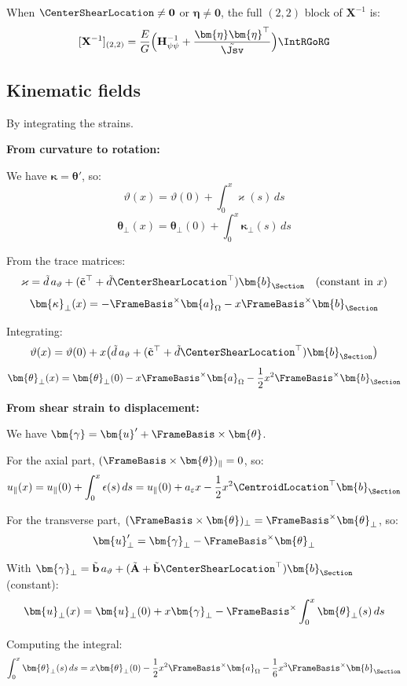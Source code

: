 When \(\CenterShearLocation \neq \mathbf{0}\) or \(\bm{\eta} \neq \mathbf{0}\),
the full \((2,2)\) block of \(\mathbf{X}^{-1}\) is:
\[[\mathbf{X}^{-1}]_{(2,2)} = \frac{E}{G}\Big(\mathbf{H}_{\psi\psi}^{-1} + \frac{\bm{\eta}\bm{\eta}^\top}{\tilde{\Jsv}}\Big)\IntRGoRG\]


\subsection{Kinematic fields}

By integrating the strains.

\textbf{From curvature to rotation:}

We have \(\bm{\kappa} = \bm{\theta}'\), so:
\[\vartheta(x) = \vartheta(0) + \int_0^x \varkappa(s)\,ds\]
\[\bm{\theta}_\perp(x) = \bm{\theta}_\perp(0) + \int_0^x \bm{\kappa}_\perp(s)\,ds\]

From the trace matrices:
\[\varkappa = \tilde{d}\,a_\vartheta + (\tilde{\mathbf{c}}^\top + \tilde{d}\CenterShearLocation^\top)\bm{b}_{\Section} \quad \text{(constant in } x\text{)}\]
\[\bm{\kappa}_\perp(x) = -\FrameBasis^\times\bm{a}_\Omega - x\FrameBasis^\times\bm{b}_{\Section}\]

Integrating:
\[\vartheta(x) = \vartheta(0) + x\big(\tilde{d}\,a_\vartheta + (\tilde{\mathbf{c}}^\top + \tilde{d}\CenterShearLocation^\top)\bm{b}_{\Section}\big)\]
\[\bm{\theta}_\perp(x) = \bm{\theta}_\perp(0) - x\FrameBasis^\times\bm{a}_\Omega - \frac{1}{2}x^2\FrameBasis^\times\bm{b}_{\Section}\]

\textbf{From shear strain to displacement:}

We have \(\bm{\gamma} = \bm{u}' + \FrameBasis \times \bm{\theta}\).

For the axial part, \((\FrameBasis \times \bm{\theta})_\parallel = 0\),
so:
\[u_\parallel(x) = u_\parallel(0) + \int_0^x \epsilon(s)\,ds = u_\parallel(0) + a_\varepsilon x - \frac{1}{2}x^2\CentroidLocation^\top\bm{b}_{\Section}\]

For the transverse part,
\((\FrameBasis \times \bm{\theta})_\perp = \FrameBasis^\times\bm{\theta}_\perp\),
so:
\[\bm{u}_\perp' = \bm{\gamma}_\perp - \FrameBasis^\times\bm{\theta}_\perp\]

With
\(\bm{\gamma}_\perp = \tilde{\mathbf{b}}\,a_\vartheta + (\tilde{\mathbf{A}} + \tilde{\mathbf{b}}\CenterShearLocation^\top)\bm{b}_{\Section}\)
(constant):
\[\bm{u}_\perp(x) = \bm{u}_\perp(0) + x\bm{\gamma}_\perp - \FrameBasis^\times\int_0^x \bm{\theta}_\perp(s)\,ds\]

Computing the integral:
\[\int_0^x \bm{\theta}_\perp(s)\,ds = x\bm{\theta}_\perp(0) - \frac{1}{2}x^2\FrameBasis^\times\bm{a}_\Omega - \frac{1}{6}x^3\FrameBasis^\times\bm{b}_{\Section}\]

